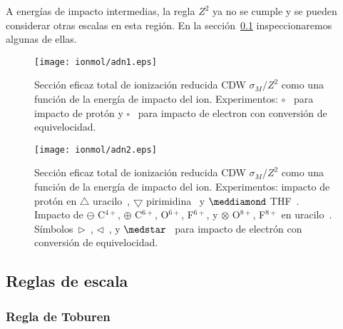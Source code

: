 A energías de impacto intermedias, la regla $Z^2$ ya no se cumple y se 
pueden considerar otras escalas en esta región. En la 
sección~\ref{subsec:scaling} inspeccionaremos algunas de ellas.



\begin{figure*}[t!]
\centering
\texttt{[image: ionmol/adn1.eps]}
\caption[Sección eficaz total de ionización reducida de moléculas (parte 1).]
{Sección eficaz total de ionización reducida CDW $\sigma_{M}/Z^2$ como una 
función de la energía de impacto del ion. Experimentos: 
\mbox{\Large$\circ$}~\cite{iriki2011} para impacto de protón y
$\square$~\cite{rahman2016} para impacto de electron con conversión de
equivelocidad.}
\label{fig:crossDNA_1}
\end{figure*} 

\begin{figure*}[t!]
\centering
\texttt{[image: ionmol/adn2.eps]}
\caption[Sección eficaz total de ionización reducida de moléculas (parte 2).]
{Sección eficaz total de ionización reducida CDW $\sigma_{M}/Z^2$ como una 
función de la energía de impacto del ion. Experimentos: impacto de protón
en $\triangle$ uracilo~\cite{itoh2013}, 
$\bigtriangledown$ pirimidina~\cite{wolff2014} y $\meddiamond$
THF~\cite{wang2016}. Impacto de $\ominus$ C$^{4+}$, $\oplus$ C$^{6+}$, 
O$^{6+}$, F$^{6+}$, y $\otimes$ O$^{8+}$, F$^{8+}$ en
uracilo~\cite{agnihotri2012,agnihotri2013}. 
Símbolos~$\rhd$~\cite{bug2017}, $\lhd$~\cite{wolf2019}, y 
$\medstar$~\cite{fuss2009} para impacto de electrón con conversión de 
equivelocidad.}
\label{fig:crossDNA_2}
\end{figure*} 

\subsection{Reglas de escala}
\label{subsec:scaling}
\subsubsection{Regla de Toburen}

